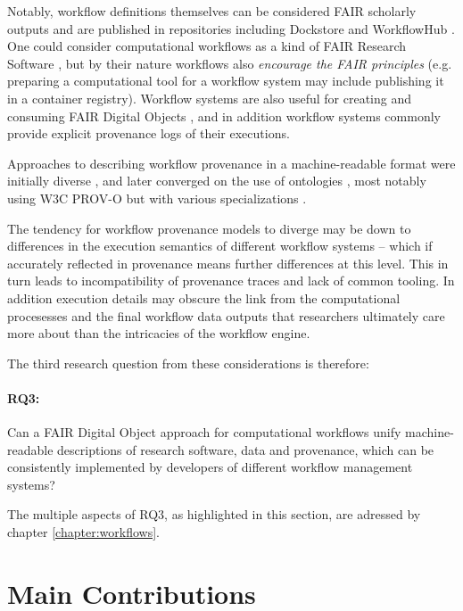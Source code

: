 Notably, workflow definitions themselves can be considered FAIR scholarly outputs \cite{Goble 2020} and are published in repositories including Dockstore \cite{Yuen 2021} and WorkflowHub \cite{Goble 2021}.
One could consider computational workflows as a kind of FAIR Research Software \cite{de Visser 2023}, but by their nature workflows also \emph{encourage the FAIR principles} (e.g. preparing a computational tool for a workflow system \cite{ch6-37} may include publishing it in a container registry). Workflow systems are also useful for creating and consuming FAIR Digital Objects \cite{ch8-27}, and in addition workflow systems commonly provide explicit provenance logs of their executions.

Approaches to describing workflow provenance in a machine-readable format were initially diverse \cite{Cruz 2009}, and later converged on the use of ontologies \cite{Missier 2010}, most notably using W3C PROV-O \cite{w3-prov-o} but with various specializations \cite{Garijo 2011,Garijo 2012,Missier 2013,Belhajjame 2015,Cuevas-Vicenttín 2016}. 

The tendency for workflow provenance models to diverge may be down to differences in the execution semantics of different workflow systems -- which if accurately reflected in provenance means further differences at this level. This in turn leads to incompatibility of provenance traces and lack of common tooling. In addition execution details may obscure the link from the computational procesesses and the final workflow data outputs that researchers ultimately care more about than the intricacies of the workflow engine.

The third research question from these considerations is therefore: 

\paragraph{RQ3:} \label{rq3} Can a FAIR Digital Object approach for computational workflows unify machine-readable descriptions of research software, data and provenance, which can be consistently implemented by developers of different workflow management systems?

The multiple aspects of RQ3, as highlighted in this section, are adressed by chapter \ref{chapter:workflows}.


\section{Main Contributions}
\label{intro:contributions}

